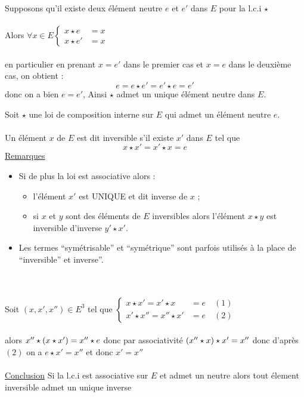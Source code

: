 \begin{dem}
    Supposons qu'il existe deux élément neutre \(e\) et \(e'\) dans \(E\) pour la l.c.i \(\star\)\\~\\
    Alors \(\forall x \in E\begin{cases}
        x \star e & = x \\
        x \star e' &= x 
    \end{cases}\)\\~\\
    en particulier en prenant \(x = e'\) dans le premier cas et \(x = e\) dans le deuxième cas, on obtient :
    \[e = e \star e' = e' \star e = e'\]
    donc on a bien \(e = e'\), Ainsi \(\star\) admet un unique élément neutre dans \(E\).
\end{dem}

\begin{defprop}[Inversibilité]
    Soit \(\star\) une loi de composition interne sur \(E\) qui admet un élément neutre \(e\).\\~\\
    Un élément \(x\) de \(E\) est dit inversible s’il existe \(x'\) dans \(E\) tel que
    \[x \star x' = x' \star x = e\]
    \underline{Remarques}
    \begin{itemize}
        \item Si de plus la loi est associative alors :
        \begin{itemize}
            \item l’élément \(x'\) est UNIQUE et dit inverse de \(x\) ;
            \item si \(x\) et \(y\) sont des éléments de \(E\) inversibles alors l’élément \(x \star y\) est inversible d’inverse \(y' \star x'\).
        \end{itemize}
        \item Les termes “symétrisable” et “symétrique” sont parfois utilisés à la place de “inversible” et inverse”.
    \end{itemize}
\end{defprop}

\begin{dem}
    ~\\~\\
    Soit \((x,x',x'') \in E^3\) tel que \(\begin{cases}
        x \star x' = x' \star x &= e \quad (1)\\
        x' \star x'' = x'' \star x' &= e \quad(2)
    \end{cases}\)\\~\\
    alors \(x''\star \left( x \star x'\right) = x'' \star e \) donc par associativité  \(\left(x'' \star x\right) \star x' = x''\) donc d'après \((2)\) on a \(e \star x' = x''\) et donc \(x' = x''\)\\~\\
    \underline{Conclusion} Si la l.c.i est associative sur \(E\) et admet un neutre alors tout élement inversible admet un unique inverse
\end{dem}

